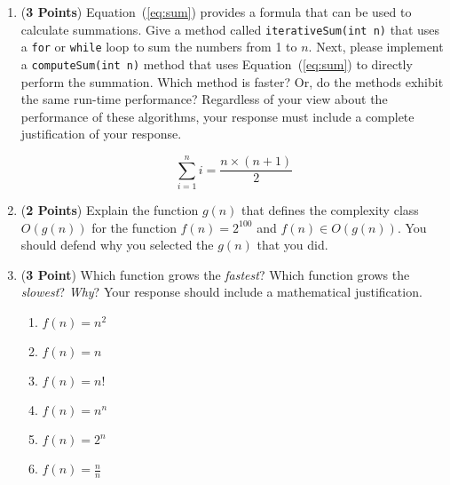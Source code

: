 \documentclass[12pt]{article}
\begin{document}
\begin{enumerate}
\begin{enumerate}
    \item ({\bf 3 Points}) Equation~(\ref{eq:sum}) provides a formula that can be used to calculate summations.  Give a
      method called {\tt iterativeSum(int n)} that uses a {\tt for} or {\tt while} loop to sum the numbers from 1 to
      $n$.  Next, please implement a {\tt computeSum(int n)} method that uses Equation~(\ref{eq:sum}) to directly
      perform the summation.  Which method is faster?  Or, do the methods exhibit the same run-time performance?
      Regardless of your view about the performance of these algorithms, your response must include a complete
      justification of your response.

      \begin{equation}
        \sum_{i=1}^{n}i = \frac{n \times (n+1)}{2}
        \label{eq:sum}
      \end{equation}

    \item ({\bf 2 Points}) Explain the function $g(n)$ that defines the complexity class $O(g(n))$ for the function
      $f(n) = 2^{100}$ and $f(n) \in O(g(n))$.  You should defend why you selected the $g(n)$ that you did.

    \item ({\bf 3 Point}) Which function grows the {\em fastest}? Which function grows the {\em slowest}?  {\em Why}?
      Your response should include a mathematical justification.

      \begin{enumerate}

        \item $f(n) = n^2$

        \item $f(n) = n$

        \item $f(n) = n!$

        \item $f(n) = n^n$

        \item $f(n) = 2^n$

        \item $f(n) = \frac{n}{n}$

      \end{enumerate}

\end{enumerate}



\end{enumerate}
\end{document}
